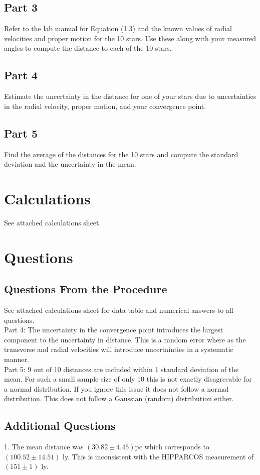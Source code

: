 \documentclass{article}
\begin{document}
\subsection{Part 3}
Refer to the lab manual for Equation (1.3) and the known values of radial velocities and proper motion for the 10 stars. Use these along with your measured angles to compute the distance to each of the 10 stars.
\subsection{Part 4}
Estimate the uncertainty in the distance for one of your stars due to uncertainties in the radial velocity, proper motion, and your convergence point.
\subsection{Part 5}
Find the average of the distances for the 10 stars and compute the standard deviation and the uncertainty in the mean.

\section{Calculations}
See attached calculations sheet.
\section{Questions}
\subsection{Questions From the Procedure}
See attached calculations sheet for data table and numerical answers to all questions.\\

Part 4: The uncertainty in the convergence point introduces the largest component to the uncertainty in distance. This is a random error where as the transverse and radial velocities will introduce uncertainties in a systematic manner.\\

Part 5: 9 out of 10 distances are included within 1 standard deviation of the mean. For such a small sample size of only 10 this is not exactly disagreeable for a normal distribution. If you ignore this issue it does not follow a normal distribution. This does not follow a Gaussian (random) distribution either.
\subsection{Additional Questions}
1. The mean distance was $(30.82\pm4.45)$pc which corresponds to $(100.52\pm14.51)$ ly. This is inconsistent with the HIPPARCOS measurement of $(151\pm1)$ ly.\\
\end{document}
